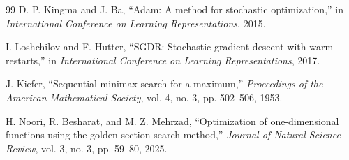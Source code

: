 \documentclass[11pt,a4paper]{article}
\begin{document}
\begin{thebibliography}{99}
D. P. Kingma and J. Ba,
``Adam: A method for stochastic optimization,''
in \emph{International Conference on Learning Representations}, 2015.

I. Loshchilov and F. Hutter,
``SGDR: Stochastic gradient descent with warm restarts,''
in \emph{International Conference on Learning Representations}, 2017.

J. Kiefer,
``Sequential minimax search for a maximum,''
\emph{Proceedings of the American Mathematical Society}, vol. 4, no. 3, pp. 502--506, 1953.

H. Noori, R. Besharat, and M. Z. Mehrzad,
``Optimization of one-dimensional functions using the golden section search method,''
\emph{Journal of Natural Science Review}, vol. 3, no. 3, pp. 59--80, 2025.

\end{thebibliography}
\end{document}
